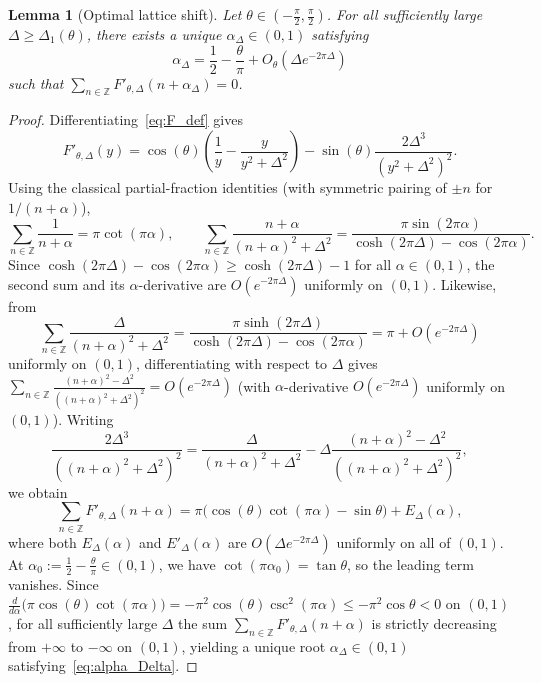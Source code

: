 \documentclass[11pt,a4paper]{amsart}
\newtheorem{lemma}[theorem]{Lemma}
\theoremstyle{remark}
\numberwithin{equation}{section}
\newcommand{\Z}{\mathbb{Z}}
\begin{document}
\begin{lemma}[Optimal lattice shift]\label{lem:alpha_Delta}
Let $\theta \in (-\frac{\pi}{2},\frac{\pi}{2})$. For all sufficiently large $\Delta \ge \Delta_1(\theta)$, there exists a unique $\alpha_\Delta \in (0,1)$ satisfying
\begin{equation}\label{eq:alpha_Delta}
  \alpha_\Delta = \frac{1}{2} - \frac{\theta}{\pi} + O_\theta\!\left(\Delta e^{-2\pi\Delta}\right)
\end{equation}
such that $\sum_{n\in\Z} F'_{\theta,\Delta}(n+\alpha_\Delta) = 0$.
\end{lemma}

\begin{proof}
Differentiating~\eqref{eq:F_def} gives
\[
  F'_{\theta,\Delta}(y) = \cos(\theta)\left(\frac{1}{y} - \frac{y}{y^2+\Delta^2}\right) - \sin(\theta)\frac{2\Delta^3}{(y^2+\Delta^2)^2}.
\]
Using the classical partial-fraction identities (with symmetric pairing of $\pm n$ for $1/(n+\alpha)$),
\[
  \sum_{n\in\Z}\frac{1}{n+\alpha} = \pi\cot(\pi\alpha),
  \qquad
  \sum_{n\in\Z}\frac{n+\alpha}{(n+\alpha)^2+\Delta^2} = \frac{\pi\sin(2\pi\alpha)}{\cosh(2\pi\Delta)-\cos(2\pi\alpha)}.
\]
Since $\cosh(2\pi\Delta) - \cos(2\pi\alpha) \ge \cosh(2\pi\Delta) - 1$ for all $\alpha \in (0,1)$, the second sum and its $\alpha$-derivative are $O(e^{-2\pi\Delta})$ uniformly on $(0,1)$. Likewise, from
\[
  \sum_{n\in\Z}\frac{\Delta}{(n+\alpha)^2+\Delta^2} = \frac{\pi\sinh(2\pi\Delta)}{\cosh(2\pi\Delta)-\cos(2\pi\alpha)} = \pi + O(e^{-2\pi\Delta})
\]
uniformly on $(0,1)$, differentiating with respect to $\Delta$ gives $\sum_{n\in\Z} \frac{(n+\alpha)^2-\Delta^2}{((n+\alpha)^2+\Delta^2)^2} = O(e^{-2\pi\Delta})$ (with $\alpha$-derivative $O(e^{-2\pi\Delta})$ uniformly on $(0,1)$). Writing
\[
  \frac{2\Delta^3}{((n+\alpha)^2+\Delta^2)^2} = \frac{\Delta}{(n+\alpha)^2+\Delta^2} - \Delta\frac{(n+\alpha)^2-\Delta^2}{((n+\alpha)^2+\Delta^2)^2},
\]
we obtain
\begin{equation}\label{eq:sum_F_prime}
  \sum_{n\in\Z} F'_{\theta,\Delta}(n+\alpha) = \pi\bigl(\cos(\theta)\cot(\pi\alpha) - \sin\theta\bigr) + E_\Delta(\alpha),
\end{equation}
where both $E_\Delta(\alpha)$ and $E'_\Delta(\alpha)$ are $O(\Delta e^{-2\pi\Delta})$ uniformly on all of $(0,1)$. At $\alpha_0 := \frac{1}{2}-\frac{\theta}{\pi} \in (0,1)$, we have $\cot(\pi\alpha_0) = \tan\theta$, so the leading term vanishes. Since $\frac{d}{d\alpha}\bigl(\pi\cos(\theta)\cot(\pi\alpha)\bigr) = -\pi^2\cos(\theta)\csc^2(\pi\alpha) \le -\pi^2\cos\theta < 0$ on $(0,1)$, for all sufficiently large $\Delta$ the sum $\sum_{n\in\Z} F'_{\theta,\Delta}(n+\alpha)$ is strictly decreasing from $+\infty$ to $-\infty$ on $(0,1)$, yielding a unique root $\alpha_\Delta \in (0,1)$ satisfying~\eqref{eq:alpha_Delta}.
\end{proof}
\end{document}
